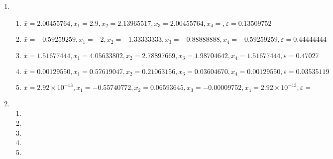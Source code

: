\documentclass[a4paper]{article}
\providecommand{\sin}{} \renewcommand{\sin}{\hspace{2pt}\mathrm{sen}}
\begin{document}
\begin{enumerate}
\item %

  \begin{enumerate}
  \item $\bar{x}=2.00455764, x_1=2.9, x_2=2.13965517, x_3=2.00455764, x_4=, \varepsilon=0.13509752$ %
  \item $\bar{x}=-0.59259259, x_1=-2, x_2=-1.33333333, x_3=-0.88888888, x_4=-0.59259259, \varepsilon=0.44444444$ %
  \item $\bar{x}=1.51677444, x_1=4.05633802, x_2=2.78897669, x_3=1.98704642, x_4=1.51677444, \varepsilon=0.47027$ %
  \item $\bar{x}=0.00129550, x_1=0.57619047, x_2=0.21063156, x_3=0.03604670, x_4=0.00129550, \varepsilon=0.03535119$ %
  \item $\bar{x}=2.92 \times 10^{-13},x_1=-0.55740772, x_2=0.06593645, x_3=-0.00009752, x_4=2.92 \times 10^{-13}, \varepsilon=$ %
  \end{enumerate}

\item 
  \begin{enumerate}
  \item %
  \item %
  \item %
  \item %
  \item %
  \end{enumerate}


\end{enumerate}
\end{document}
